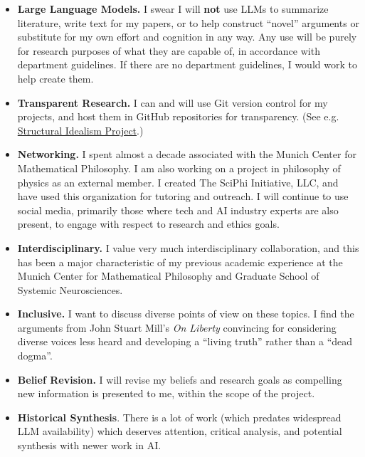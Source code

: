 \documentclass[11pt, oneside]{article}   	%
\begin{document}
\begin{itemize}
    \item \textbf{Large Language Models.}  I swear I will \textbf{not} use LLMs to summarize literature, write text for my papers, or to help construct ``novel'' arguments or substitute for my own effort and cognition in any way. Any use will be purely for research purposes of what they are capable of, in accordance with department guidelines.  If there are no department guidelines, I would work to help create them. 
    \item \textbf{Transparent Research.}  I can and will use Git version control for my projects, and host them in GitHub repositories for transparency.  (See e.g. \href{https://github.com/CameronBeebe/Structural_Idealism}{Structural Idealism Project}.) 
    \item \textbf{Networking.} I spent almost a decade associated with the Munich Center for Mathematical Philosophy.  I am also working on a project in philosophy of physics as an external member.  I created The SciPhi Initiative, LLC, and have used this organization for tutoring and outreach.  I will continue to use social media, primarily those where tech and AI industry experts are also present, to engage with respect to research and ethics goals.
    \item \textbf{Interdisciplinary.}  I value very much interdisciplinary collaboration, and this has been a major characteristic of my previous academic experience at the Munich Center for Mathematical Philosophy and Graduate School of Systemic Neurosciences.
    \item \textbf{Inclusive.}  I want to discuss diverse points of view on these topics.  I find the arguments from John Stuart Mill's \emph{On Liberty} \citep{OnLiberty1859} convincing for considering diverse voices less heard and developing a ``living truth'' rather than a ``dead dogma''.
    \item \textbf{Belief Revision.}  I will revise my beliefs and research goals as compelling new information is presented to me, within the scope of the project.
    \item \textbf{Historical Synthesis}.  There is a lot of work (which predates widespread LLM availability) which deserves attention, critical analysis, and potential synthesis with newer work in AI.
    
\end{itemize}
\end{document}
